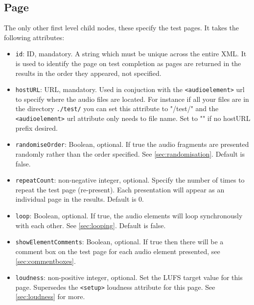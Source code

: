\documentclass[11pt, oneside]{article}   	%
\begin{document}
    \subsection{Page}
        The only other first level child nodes, these specify the test pages. It takes the following attributes:
        \begin{itemize}
            \item \texttt{id}: ID, mandatory. A string which must be unique across the entire XML. It is used to identify the page on test completion as pages are returned in the results in the order they appeared, not specified.
            \item \texttt{hostURL}: URL, mandatory. Used in conjuction with the \texttt{<audioelement>} url to specify where the audio files are located. For instance if all your files are in the directory \texttt{./test/} you can set this attribute to "/test/" and the \texttt{<audioelement>} url attribute only needs to file name. Set to "" if no hostURL prefix desired.
            \item \texttt{randomiseOrder}: Boolean, optional. If true the audio fragments are presented randomly rather than the order specified. See \ref{sec:randomisation}. Default is false.
            \item \texttt{repeatCount}: non-negative integer, optional. Specify the number of times to repeat the test page (re-present). Each presentation will appear as an individual page in the results. Default is 0.
            \item \texttt{loop}: Boolean, optional. If true, the audio elements will loop synchronously with each other. See \ref{sec:looping}. Default is false.
            \item \texttt{showElementComments}: Boolean, optional. If true then there will be a comment box on the test page for each audio element presented, see \ref{sec:commentboxes}.
            \item \texttt{loudness}: non-positive integer, optional. Set the LUFS target value for this page. Supersedes the \texttt{<setup>} loudness attribute for this page. See \ref{sec:loudness} for more.
        \end{itemize}
        
\end{document}
